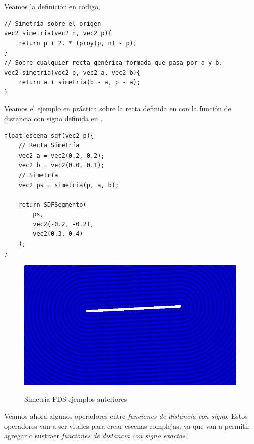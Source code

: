 \newpage
Veamos la definición en código,
\begin{lstlisting}
// Simetría sobre el origen
vec2 simetria(vec2 n, vec2 p){
    return p + 2. * (proy(p, n) - p);
}
// Sobre cualquier recta genérica formada que pasa por a y b.
vec2 simetria(vec2 p, vec2 a, vec2 b){
    return a + simetria(b - a, p - a);
}
\end{lstlisting}
Veamos el ejemplo en práctica sobre la recta definida en  con la función de distancia con signo definida en .
\begin{lstlisting}
float escena_sdf(vec2 p){
    // Recta Simetría
    vec2 a = vec2(0.2, 0.2);
    vec2 b = vec2(0.0, 0.1);
    // Simetría
    vec2 ps = simetria(p, a, b);
    
    return SDFSegmento(
        ps,
        vec2(-0.2, -0.2), 
        vec2(0.3, 0.4)
    );
}
\end{lstlisting}

\begin{figure}[H]
  \centering
  \captionsetup{justification=centering}%
  \includegraphics[width=1.0\textwidth]{secciones/imagenes/sdf/2d/sdf_simetria.png}\label{fig:simetria}
  \caption{Simetría FDS ejemplos anteriores}
\end{figure}

Veamos ahora algunos operadores entre \textit{funciones de distancia con signo}. Estos operadores van a ser vitales para crear escenas complejas, ya que van a permitir agregar o sustraer \textit{funciones de distancia con signo exactas}.

